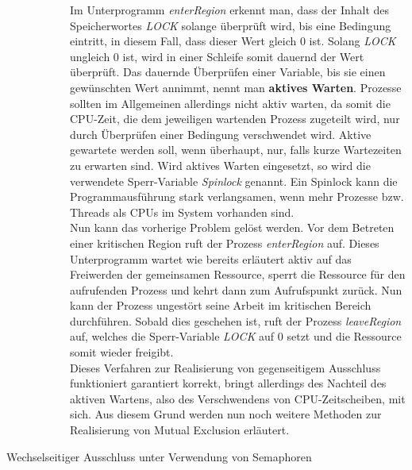 \begin{description}
\begin{description}
								Im Unterprogramm \textit{enterRegion} erkennt man, dass der Inhalt des Speicherwortes \textit{LOCK} solange überprüft wird, bis eine Bedingung eintritt, in diesem Fall, dass dieser Wert gleich 0 ist. Solang \textit{LOCK} ungleich 0 ist, wird in einer Schleife somit dauernd der Wert überprüft. Das dauernde Überprüfen einer Variable, bis sie einen gewünschten Wert annimmt, nennt man \textbf{aktives Warten}. Prozesse sollten im Allgemeinen allerdings nicht aktiv warten, da somit die CPU-Zeit, die dem jeweiligen wartenden Prozess zugeteilt wird, nur durch Überprüfen einer Bedingung verschwendet wird. Aktive gewartete werden soll, wenn überhaupt, nur, falls kurze Wartezeiten zu erwarten sind. Wird aktives Warten eingesetzt, so wird die verwendete Sperr-Variable \textit{Spinlock} genannt. Ein Spinlock kann die Programmausführung stark verlangsamen, wenn mehr Prozesse bzw. Threads als CPUs im System vorhanden sind. \cite{SpinlockWikipedia}\\
								Nun kann das vorherige Problem gelöst werden. Vor dem Betreten einer kritischen Region ruft der Prozess \textit{enterRegion} auf. Dieses Unterprogramm wartet wie bereits erläutert aktiv auf das Freiwerden der gemeinsamen Ressource, sperrt die Ressource für den aufrufenden Prozess und kehrt dann zum Aufrufspunkt zurück. Nun kann der Prozess ungestört seine Arbeit im kritischen Bereich durchführen. Sobald dies geschehen ist, ruft der Prozess \textit{leaveRegion} auf, welches die Sperr-Variable \textit{LOCK} auf 0 setzt und die Ressource somit wieder freigibt.\\
								Dieses Verfahren zur Realisierung von gegenseitigem Ausschluss funktioniert garantiert korrekt, bringt allerdings des Nachteil des aktiven Wartens, also des Verschwendens von CPU-Zeitscheiben, mit sich. Aus diesem Grund werden nun noch weitere Methoden zur Realisierung von Mutual Exclusion erläutert.
						\end{description}
				
					\item[Wechselseitiger Ausschluss unter Verwendung von Semaphoren]
					

\end{description}
